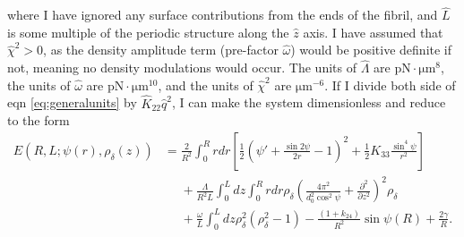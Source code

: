 \documentclass[12pt]{article}
\begin{document}
where I have ignored any surface contributions from the ends of the fibril, and $\hat{L}$ is some multiple of the periodic structure along the $\hat{z}$ axis. I have assumed that $\hat{\chi}^2>0$, as the density amplitude term (pre-factor $\hat{\omega}$) would be positive definite if not, meaning no density modulations would occur. The units of $\hat{\Lambda}$ are $\si{\pico\newton\cdot\micro\meter^8}$, the units of $\hat{\omega}$ are $\si{\pico\newton\cdot\micro\meter^{10}}$, and the units of $\hat{\chi}^2$ are $\si{\micro\meter^{-6}}$. If I divide both side of eqn \ref{eq:generalunits} by $\hat{K}_{22}\hat{q}^2$, I can make the system dimensionless and reduce to the form
\begin{align}\label{eq:general}
E(R,L;\psi(r),\rho_{\delta}(z))&=\frac{2}{R^2}\int_0^{R}rdr\left[\frac{1}{2}\left(\psi'+\frac{\sin2\psi}{2r}-1\right)^2+\frac{1}{2}K_{33}\frac{\sin^4\psi}{r^2}\right]\nonumber\\
&\phantom{=}+\frac{\Lambda}{R^2L}\int_0^{L}dz\int_0^{R}rdr\rho_{\delta}\left(\frac{4\pi^2}{d_0^2\cos^2\psi}+\frac{\partial^2}{\partial z^2}\right)^2\rho_{\delta}\nonumber\\
&\phantom{=}+\frac{\omega}{L}\int_0^{L}dz\rho_{\delta}^2\left(\rho_{\delta}^2-1\right)-\frac{(1+k_{24})}{R^2}\sin\psi(R)+\frac{2\gamma}{R}.
\end{align}
\end{document}
